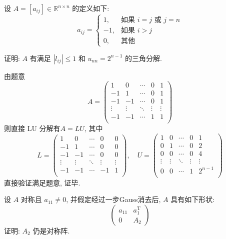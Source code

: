 \documentclass[12pt, answers]{exam}     %
\newcommand{\R}{\mathbb{R}}
\newcommand{\T}{\mathrm{T}}
\begin{document}
\begin{questions}
\question{}
设 \( A = [a_{ij}] \in \R^{n \times n} \) 的定义如下: 
\[ a_{ij} =
\begin{cases} 
1, & \text{如果 } i = j \text{ 或 } j = n \\
-1, & \text{如果 } i > j \\
0, & \text{其他}
\end{cases}
\]

证明: \( A \) 有满足 \( |l_{ij}| \leq 1 \) 和 \( u_{nn} = 2^{n-1} \) 的三角分解. 

\begin{solution}
由题意
\[ A = \begin{pmatrix}
1 & 0 & \cdots & 0 & 1 \\
-1 & 1 & \cdots & 0 & 1 \\
-1 & -1 & \cdots & 0 & 1 \\
\vdots & \vdots & \ddots & \vdots & \vdots \\
-1 & -1 & \cdots & 1 & 1 \\
\end{pmatrix} \]
则直接 LU 分解有\( A = LU \), 其中
\[ L = \begin{pmatrix}
1 & 0 & \cdots & 0 & 0 \\
-1 & 1 & \cdots & 0 & 0 \\
-1 & -1 & \cdots & 0 & 0 \\
\vdots & \vdots & \ddots & \vdots & \vdots \\
-1 & -1 & \cdots & -1 & 1 \\
\end{pmatrix}, \quad
U = \begin{pmatrix}
1 & 0 & \cdots & 0 & 1 \\
0 & 1 & \cdots & 0 & 2 \\
0 & 0 & \cdots & 0 & 4 \\
\vdots & \vdots & \ddots & \vdots & \vdots \\
0 & 0 & \cdots & 1 & 2^{n-1} \\
\end{pmatrix} \]
直接验证满足题意, 证毕. 
\end{solution}

\question{}
设 \( A \) 对称且 \( a_{11} \neq 0 \), 并假定经过一步Gauss消去后, \( A \) 具有如下形状: 
\[
\begin{pmatrix}
a_{11} & a_1^{\T} \\
0 & A_2
\end{pmatrix}
\]
证明: \( A_2 \) 仍是对称阵. 


\end{questions}
\end{document}
